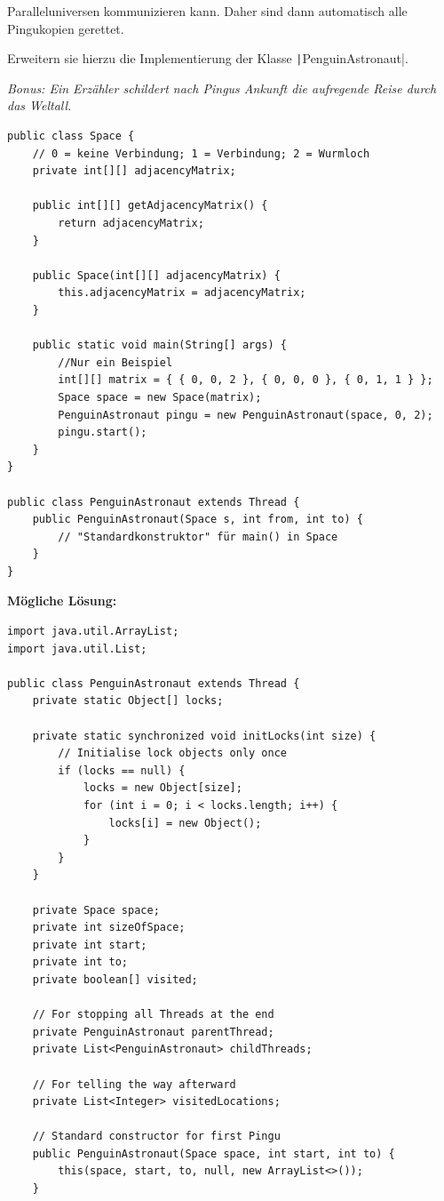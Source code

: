 \documentclass[11pt]{exam} %
\newcommand{\code}[1]{\texttt|#1|}
\begin{document}
\begin{questions}
Paralleluniversen kommunizieren kann. Daher sind dann automatisch alle Pingukopien gerettet.\par
Erweitern sie hierzu die Implementierung der Klasse \code{PenguinAstronaut}.\par
\emph{Bonus: Ein Erzähler schildert nach Pingus Ankunft die aufregende Reise durch das Weltall.}\par
\begin{minipage}{\linewidth}
\begin{verbatim}
public class Space {
	// 0 = keine Verbindung; 1 = Verbindung; 2 = Wurmloch
	private int[][] adjacencyMatrix; 

	public int[][] getAdjacencyMatrix() {
		return adjacencyMatrix;
	}
	
	public Space(int[][] adjacencyMatrix) {
		this.adjacencyMatrix = adjacencyMatrix;
	}
	
	public static void main(String[] args) {
		//Nur ein Beispiel
		int[][] matrix = { { 0, 0, 2 }, { 0, 0, 0 }, { 0, 1, 1 } };
		Space space = new Space(matrix);
		PenguinAstronaut pingu = new PenguinAstronaut(space, 0, 2);
		pingu.start();
	}
}

public class PenguinAstronaut extends Thread {
	public PenguinAstronaut(Space s, int from, int to) {
		// "Standardkonstruktor" für main() in Space
	}
}
\end{verbatim}
\end{minipage}
\ifprintanswers
\filbreak
\textbf{Mögliche Lösung:}\par\nobreak
\begin{verbatim}
import java.util.ArrayList;
import java.util.List;

public class PenguinAstronaut extends Thread {
	private static Object[] locks;

	private static synchronized void initLocks(int size) {
		// Initialise lock objects only once
		if (locks == null) {
			locks = new Object[size];
			for (int i = 0; i < locks.length; i++) {
				locks[i] = new Object();
			}
		}
	}

	private Space space;
	private int sizeOfSpace;
	private int start;
	private int to;
	private boolean[] visited;

	// For stopping all Threads at the end
	private PenguinAstronaut parentThread;
	private List<PenguinAstronaut> childThreads;

	// For telling the way afterward
	private List<Integer> visitedLocations;

	// Standard constructor for first Pingu
	public PenguinAstronaut(Space space, int start, int to) {
		this(space, start, to, null, new ArrayList<>());
	}


\end{verbatim}
\end{questions}
\end{document}
